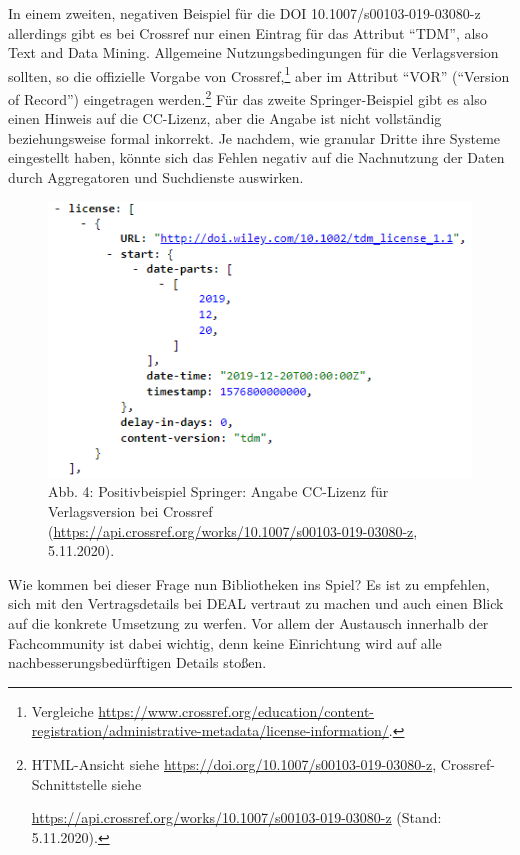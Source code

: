 \documentclass[a4paper,
fontsize=11pt,
oneside,
numbers=noperiodatend,
parskip=half-,
bibliography=totoc,
final
]{scrartcl}
\begin{document}
In einem zweiten, negativen Beispiel für die DOI
10.1007/s00103-019-03080-z allerdings gibt es bei Crossref nur einen
Eintrag für das Attribut \enquote{TDM}, also Text and Data Mining.
Allgemeine Nutzungsbedingungen für die Verlagsversion sollten, so die
offizielle Vorgabe von Crossref,\footnote{Vergleiche
  \url{https://www.crossref.org/education/content-registration/administrative-metadata/license-information/}.}
aber im Attribut \enquote{VOR} (\enquote{Version of Record}) eingetragen
werden.\footnote{HTML-Ansicht siehe
  \url{https://doi.org/10.1007/s00103-019-03080-z},
  Crossref-Schnittstelle siehe

  \url{https://api.crossref.org/works/10.1007/s00103-019-03080-z} (Stand:
  5.11.2020).} Für das zweite Springer-Beispiel gibt es also einen
Hinweis auf die CC-Lizenz, aber die Angabe ist nicht vollständig
beziehungsweise formal inkorrekt. Je nachdem, wie granular Dritte ihre
Systeme eingestellt haben, könnte sich das Fehlen negativ auf die
Nachnutzung der Daten durch Aggregatoren und Suchdienste auswirken.

\begin{figure}
\centering
\includegraphics{img/CRwileyNEG.png}
\caption{Abb. 4: Positivbeispiel Springer: Angabe CC-Lizenz für
Verlagsversion bei Crossref
(\url{https://api.crossref.org/works/10.1007/s00103-019-03080-z},
5.11.2020).}
\end{figure}

Wie kommen bei dieser Frage nun Bibliotheken ins Spiel? Es ist zu
empfehlen, sich mit den Vertragsdetails bei DEAL vertraut zu machen und
auch einen Blick auf die konkrete Umsetzung zu werfen. Vor allem der
Austausch innerhalb der Fachcommunity ist dabei wichtig, denn keine
Einrichtung wird auf alle nachbesserungsbedürftigen Details stoßen.
\end{document}
